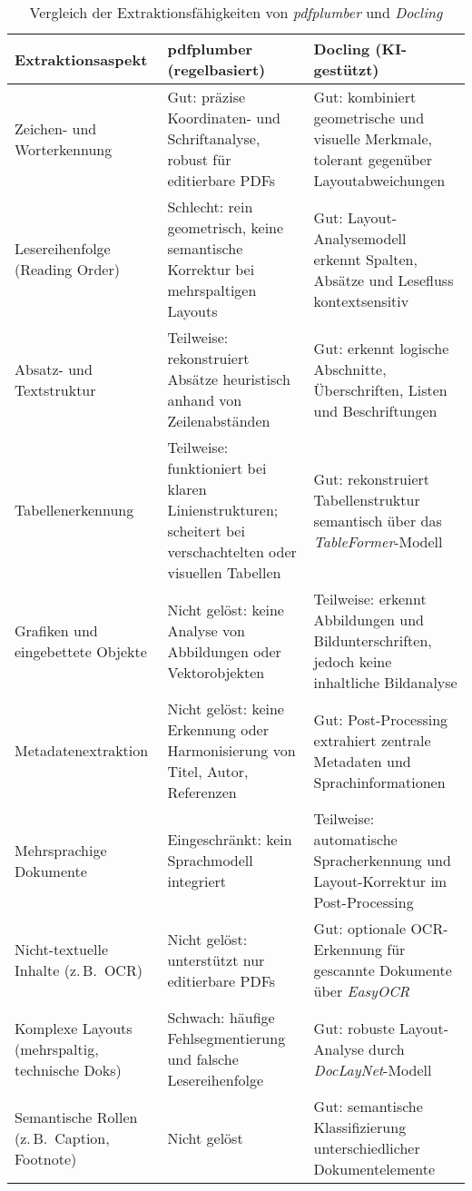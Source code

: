\begin{table}[h!]
\centering
\caption{Vergleich der Extraktionsfähigkeiten von \textit{pdfplumber} und \textit{Docling}}
\label{tab:extraktion_vergleich}
\begin{tabular}{p{5cm}p{4cm}p{4cm}}
\hline
\textbf{Extraktionsaspekt} & \textbf{pdfplumber (regelbasiert)} & \textbf{Docling (KI-gestützt)} \\
\hline
Zeichen- und Worterkennung & Gut: präzise Koordinaten- und Schriftanalyse, robust für editierbare PDFs & Gut: kombiniert geometrische und visuelle Merkmale, tolerant gegenüber Layoutabweichungen \\
Lesereihenfolge (Reading Order) & Schlecht: rein geometrisch, keine semantische Korrektur bei mehrspaltigen Layouts & Gut: Layout-Analysemodell erkennt Spalten, Absätze und Lesefluss kontextsensitiv \\
Absatz- und Textstruktur & Teilweise: rekonstruiert Absätze heuristisch anhand von Zeilenabständen & Gut: erkennt logische Abschnitte, Überschriften, Listen und Beschriftungen \\
Tabellenerkennung & Teilweise: funktioniert bei klaren Linienstrukturen; scheitert bei verschachtelten oder visuellen Tabellen & Gut: rekonstruiert Tabellenstruktur semantisch über das \emph{TableFormer}-Modell \\
Grafiken und eingebettete Objekte & Nicht gelöst: keine Analyse von Abbildungen oder Vektorobjekten & Teilweise: erkennt Abbildungen und Bildunterschriften, jedoch keine inhaltliche Bildanalyse \\
Metadatenextraktion & Nicht gelöst: keine Erkennung oder Harmonisierung von Titel, Autor, Referenzen & Gut: Post-Processing extrahiert zentrale Metadaten und Sprachinformationen \\
Mehrsprachige Dokumente & Eingeschränkt: kein Sprachmodell integriert & Teilweise: automatische Spracherkennung und Layout-Korrektur im Post-Processing \\
Nicht-textuelle Inhalte (z.\,B.\ OCR) & Nicht gelöst: unterstützt nur editierbare PDFs & Gut: optionale OCR-Erkennung für gescannte Dokumente über \emph{EasyOCR} \\
Komplexe Layouts (mehrspaltig, technische Doks) & Schwach: häufige Fehlsegmentierung und falsche Lesereihenfolge & Gut: robuste Layout-Analyse durch \emph{DocLayNet}-Modell \\
Semantische Rollen (z.\,B.\ Caption, Footnote) & Nicht gelöst & Gut: semantische Klassifizierung unterschiedlicher Dokumentelemente \\
\hline
\end{tabular}
\end{table}






